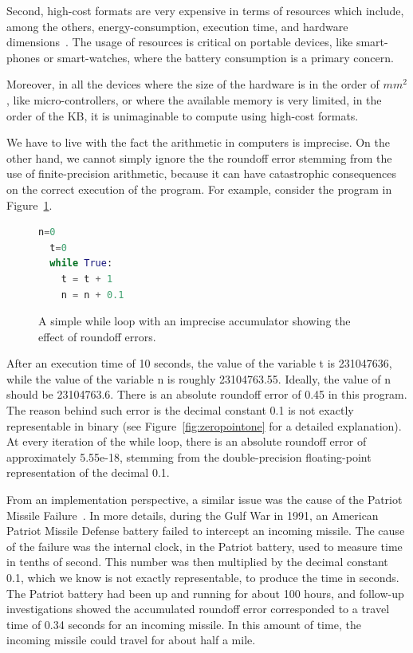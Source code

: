 Second, high-cost formats are very expensive in terms of resources which include, among the others, energy-consumption, execution time, and hardware dimensions~\cite{fppower, lutnet}. 
%
The usage of resources is critical on portable devices, like smart-phones or smart-watches, where the battery consumption is a primary concern.
%

Moreover, in all the devices where the size of the hardware is in the order of $mm^{2}$, like micro-controllers, or where the available memory is very limited, in the order of the KB, it is unimaginable to compute using high-cost formats.
%

We have to live with the fact the arithmetic in computers is imprecise.
%
On the other hand, we cannot simply ignore the the roundoff error stemming from the use of finite-precision arithmetic, because it can have catastrophic consequences on the correct execution of the program.
%
For example, consider the program in Figure~\ref{fig:while}.
%
\begin{figure}[tb!]
	\begin{lstlisting}[frame=single, language=Python]
  n=0
  t=0
  while True:
    t = t + 1
    n = n + 0.1
	\end{lstlisting}
	\caption{A simple while loop with an imprecise accumulator showing the effect of roundoff errors.}\label{fig:while}
\end{figure}

%
After an execution time of 10 seconds, the value of the variable t is 231047636, while the value of the variable n is roughly 23104763.55.
%
Ideally, the value of n should be 23104763.6.
%
There is an absolute roundoff error of 0.45 in this program.
%
The reason behind such error is the decimal constant 0.1 is not exactly representable in binary (see Figure~\ref{fig:zeropointone} for a detailed explanation). 
%
At every iteration of the while loop, there is an absolute roundoff error of approximately 5.55e-18, stemming from the double-precision floating-point representation of the decimal 0.1. 
%

From an implementation perspective, a similar issue was the cause of the Patriot Missile Failure~\cite{patriot}.
%
In more details, during the Gulf War in 1991, an American Patriot Missile Defense battery failed to intercept an incoming missile.
%
The cause of the failure was the internal clock, in the Patriot battery, used to measure time in tenths of second.
%
This number was then multiplied by the decimal constant 0.1, which we know is not exactly representable, to produce the time in seconds.
%
The Patriot battery had been up and running for about 100 hours, and follow-up investigations showed the accumulated roundoff error corresponded to a travel time of 0.34 seconds for an incoming missile. 
%
In this amount of time, the incoming missile could travel for about half a mile.

